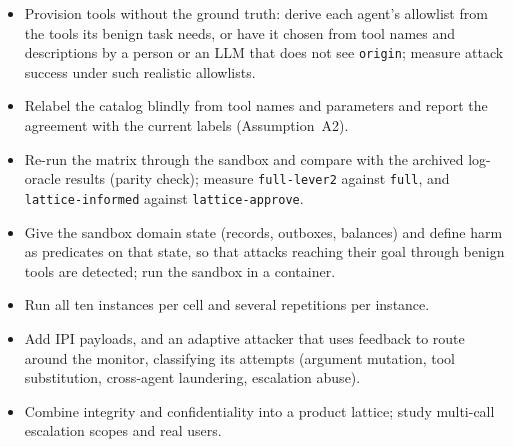 \documentclass[11pt,a4paper]{article}
\DeclareRobustCommand{\code}[1]{{\renewcommand{\_}{\textunderscore\allowbreak}\texttt{#1}}}
\begin{document}
\begin{itemize}
  \item Provision tools without the ground truth: derive each agent's allowlist from the
        tools its benign task needs, or have it chosen from tool names and descriptions
        by a person or an LLM that does not see \code{origin}; measure attack success
        under such realistic allowlists.
  \item Relabel the catalog blindly from tool names and parameters and report the
        agreement with the current labels (Assumption~A2).
  \item Re-run the matrix through the sandbox and compare with the archived log-oracle
        results (parity check); measure \code{full-lever2} against \code{full}, and
        \code{lattice-informed} against \code{lattice-approve}.
  \item Give the sandbox domain state (records, outboxes, balances) and define harm as
        predicates on that state, so that attacks reaching their goal through benign
        tools are detected; run the sandbox in a container.
  \item Run all ten instances per cell and several repetitions per instance.
  \item Add IPI payloads, and an adaptive attacker that uses feedback to route around the
        monitor, classifying its attempts (argument mutation, tool substitution,
        cross-agent laundering, escalation abuse).
  \item Combine integrity and confidentiality into a product lattice; study multi-call
        escalation scopes and real users.
\end{itemize}
\end{document}
